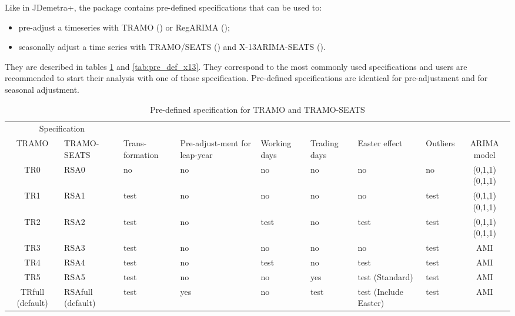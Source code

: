\documentclass[article]{jss}
\providecommand{\tightlist}{%
  \setlength{\itemsep}{0pt}\setlength{\parskip}{0pt}}
\begin{document}
Like in JDemetra+, the  package contains pre-defined
specifications that can be used to:

\begin{itemize}
\tightlist
\item
  pre-adjust a timeseries with TRAMO ()
  or RegARIMA ();\\
\item
  seasonally adjust a time series with TRAMO/SEATS
  () and X-13ARIMA-SEATS ().
\end{itemize}

They are described in tables \ref{tab:pre_def_ts} and
\ref{tab:pre_def_x13}. They correspond to the most commonly used
specifications and users are recommended to start their analysis with
one of those specification. Pre-defined specifications are identical for
pre-adjustment and for seasonal adjustment.

\begin{table}

\caption{\label{tab:unnamed-chunk-7}\label{tab:pre_def_ts}Pre-defined specification for TRAMO and TRAMO-SEATS}
\centering
\fontsize{7}{9}\selectfont
\begin{tabular}[t]{c>{\centering\arraybackslash}p{}>{\centering\arraybackslash}p{}>{\centering\arraybackslash}p{1.5cm}>{\centering\arraybackslash}p{0.9cm}>{\centering\arraybackslash}p{0.9cm}>{\centering\arraybackslash}p{1.5cm}>{\centering\arraybackslash}p{0.9cm}c}
\toprule
\multicolumn{2}{c}{Specification} & \multicolumn{1}{c}{} \\
\cmidrule(l{2pt}r{2pt}){1-2}
TRAMO & TRAMO-SEATS & Trans-formation & Pre-adjust-ment for leap-year & Working days & Trading days & Easter effect & Outliers & ARIMA model\\
\midrule
TR0 & RSA0 & no & no & no & no & no & no & (0,1,1)(0,1,1)\\
TR1 & RSA1 & test & no & no & no & no & test & (0,1,1)(0,1,1)\\
TR2 & RSA2 & test & no & test & no & test & test & (0,1,1)(0,1,1)\\
TR3 & RSA3 & test & no & no & no & no & test & AMI\\
TR4 & RSA4 & test & no & test & no & test & test & AMI\\
\addlinespace
TR5 & RSA5 & test & no & no & yes & test (Standard) & test & AMI\\
TRfull (default) & RSAfull (default) & test & yes & no & test & test (Include Easter) & test & AMI\\
\bottomrule
\end{tabular}
\end{table}
\end{document}
